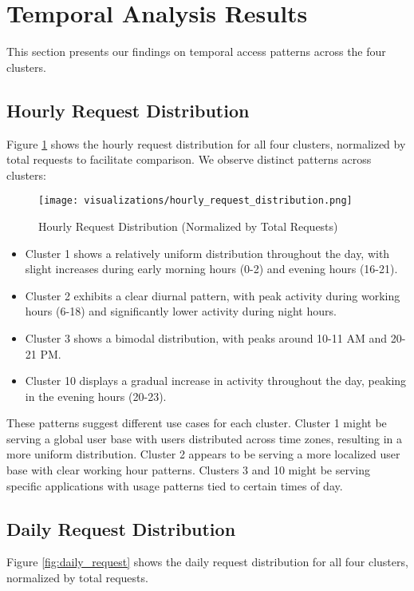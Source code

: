 \documentclass[conference]{IEEEtran}
\begin{document}
\section{Temporal Analysis Results}
This section presents our findings on temporal access patterns across the four clusters.

\subsection{Hourly Request Distribution}
Figure \ref{fig:hourly_request} shows the hourly request distribution for all four clusters, normalized by total requests to facilitate comparison. We observe distinct patterns across clusters:


\begin{figure}[htbp]
    \centering
    \texttt{[image: visualizations/hourly\_request\_distribution.png]}
    \caption{Hourly Request Distribution (Normalized by Total Requests)}
    \label{fig:hourly_request}
\end{figure}


\begin{itemize}
    \item Cluster 1 shows a relatively uniform distribution throughout the day, with slight increases during early morning hours (0-2) and evening hours (16-21).
    \item Cluster 2 exhibits a clear diurnal pattern, with peak activity during working hours (6-18) and significantly lower activity during night hours.
    \item Cluster 3 shows a bimodal distribution, with peaks around 10-11 AM and 20-21 PM.
    \item Cluster 10 displays a gradual increase in activity throughout the day, peaking in the evening hours (20-23).
\end{itemize}

These patterns suggest different use cases for each cluster. Cluster 1 might be serving a global user base with users distributed across time zones, resulting in a more uniform distribution. Cluster 2 appears to be serving a more localized user base with clear working hour patterns. Clusters 3 and 10 might be serving specific applications with usage patterns tied to certain times of day.

\subsection{Daily Request Distribution}
Figure \ref{fig:daily_request} shows the daily request distribution for all four clusters, normalized by total requests.
\end{document}
